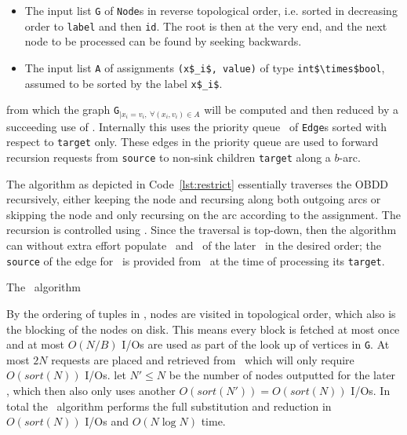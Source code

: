 \begin{itemize}
\item The input list \lstinline{G} of \lstinline{Node}s in reverse topological
  order, i.e. sorted in decreasing order to \lstinline{label} and then
  \lstinline{id}. The root is then at the very end, and the next node to be
  processed can be found by seeking backwards.

\item The input list \lstinline{A} of assignments \lstinline{(x$_i$, value)} of
  type \lstinline{int$\times$bool}, assumed to be sorted by the label
  \lstinline{x$_i$}.
\end{itemize}
from which the graph \lstinline{G}$_{| x_i = v_i ,\ \forall (x_i,v_i) \in A}$
will be computed and then reduced by a succeeding use of \Reduce. Internally
this uses the priority queue \RestrictQrec\ of \lstinline{Edge}s sorted with
respect to \lstinline{target} only. These edges in the priority queue are used
to forward recursion requests from \lstinline{source} to non-sink children
\lstinline{target} along a $b$-arc.

The algorithm as depicted in Code~\ref{lst:restrict} essentially traverses the
OBDD recursively, either keeping the node and recursing along both outgoing arcs
or skipping the node and only recursing on the arc according to the assignment.
The recursion is controlled using \RestrictQrec. Since the traversal is
top-down, then the algorithm can without extra effort populate \ReduceLforward\
and \ReduceQdep\ of the later \Reduce\ in the desired order; the
\lstinline{source} of the edge for \ReduceLforward\ is provided from
\RestrictQrec\ at the time of processing its \lstinline{target}.

\begin{lstfloat}
  \centering

  

  \caption{The \Restrict\ algorithm}
  \label{lst:restrict}
\end{lstfloat}

By the ordering of tuples in \RestrictQrec, nodes are visited in topological
order, which also is the blocking of the nodes on disk. This means every block
is fetched at most once and at most $O(N/B)$ I/Os are used as part of the look
up of vertices in \lstinline{G}. At most $2N$ requests are placed and retrieved
from \Q\ which will only require $O(sort(N))$ I/Os. let $N' \leq N$ be the
number of nodes outputted for the later \Reduce, which then also only uses
another $O(sort(N')) = O(sort(N))$ I/Os. In total the \Restrict\ algorithm
performs the full substitution and reduction in $O(sort(N))$ I/Os and $O(N \log
N)$ time.

